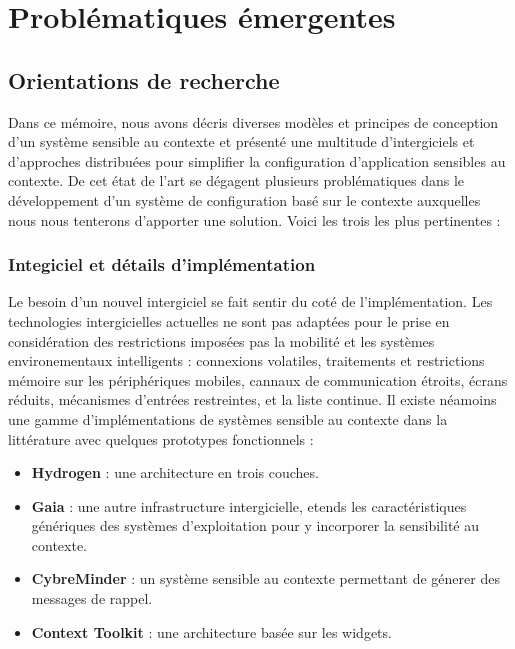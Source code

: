 \chapter{Problématiques émergentes}

\section{Orientations de recherche}

Dans ce mémoire, nous avons décris diverses modèles et principes de conception
d'un système sensible au contexte et présenté une multitude d'intergiciels et
d'approches distribuées pour simplifier la configuration d'application sensibles
au contexte. De cet état de l'art se dégagent plusieurs problématiques dans le
développement d'un système de configuration basé sur le contexte auxquelles nous
nous tenterons d'apporter une solution. Voici les trois les plus pertinentes :

\subsection{Integiciel et détails d'implémentation}

Le besoin d'un nouvel intergiciel se fait sentir du coté de l'implémentation.
Les technologies intergicielles actuelles ne sont pas adaptées pour le prise en
considération des restrictions imposées pas la mobilité et les systèmes
environementaux intelligents : connexions volatiles, traitements et restrictions
mémoire sur les périphériques mobiles, cannaux de communication étroits, écrans
réduits, mécanismes d'entrées restreintes, et la liste continue. Il existe
néamoins une gamme d'implémentations de systèmes sensible au contexte dans la
littérature avec quelques prototypes fonctionnels :

\begin{itemize}
    \item \textbf{Hydrogen} \cite{hofer_context-awareness_2003}: 
	    une architecture en trois couches.
    \item \textbf{Gaia} \cite{chetan_mobile_2005}: 
            une autre infrastructure intergicielle, etends les caractéristiques
	    génériques des systèmes d'exploitation pour y incorporer la
	    sensibilité au contexte.
    \item \textbf{CybreMinder} \cite{abowd_context-aware_2002}: 
	    un système sensible au contexte permettant de génerer des messages
	    de rappel.
    \item \textbf{Context Toolkit} \cite{dey_conceptual_2001}: 
	    une architecture basée sur les widgets.
\end{itemize}

